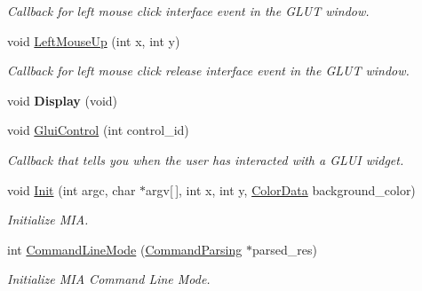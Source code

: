 \begin{DoxyCompactItemize}
\begin{DoxyCompactList}\small\item\em Callback for left mouse click interface event in the G\+L\+UT window. \end{DoxyCompactList}\item 
void \hyperlink{classimage__tools_1_1MIAApp_a2717842596d33af77f20644527a8b556}{Left\+Mouse\+Up} (int x, int y)\hypertarget{classimage__tools_1_1MIAApp_a2717842596d33af77f20644527a8b556}{}\label{classimage__tools_1_1MIAApp_a2717842596d33af77f20644527a8b556}

\begin{DoxyCompactList}\small\item\em Callback for left mouse click release interface event in the G\+L\+UT window. \end{DoxyCompactList}\item 
void {\bfseries Display} (void)\hypertarget{classimage__tools_1_1MIAApp_add76b61a146970333b216e027aabc3bc}{}\label{classimage__tools_1_1MIAApp_add76b61a146970333b216e027aabc3bc}

\item 
void \hyperlink{classimage__tools_1_1MIAApp_a4e10cc8b814e12c16c38d4e2be3bf2bb}{Glui\+Control} (int control\+\_\+id)\hypertarget{classimage__tools_1_1MIAApp_a4e10cc8b814e12c16c38d4e2be3bf2bb}{}\label{classimage__tools_1_1MIAApp_a4e10cc8b814e12c16c38d4e2be3bf2bb}

\begin{DoxyCompactList}\small\item\em Callback that tells you when the user has interacted with a G\+L\+UI widget. \end{DoxyCompactList}\item 
void \hyperlink{classimage__tools_1_1MIAApp_ab5bd2eb36e76c8bb81bef6c56f6bf55d}{Init} (int argc, char $\ast$argv\mbox{[}$\,$\mbox{]}, int x, int y, \hyperlink{classimage__tools_1_1ColorData}{Color\+Data} background\+\_\+color)
\begin{DoxyCompactList}\small\item\em Initialize M\+IA. \end{DoxyCompactList}\item 
int \hyperlink{classimage__tools_1_1MIAApp_a27afba91574efa52f0f77f62b69fc9a8}{Command\+Line\+Mode} (\hyperlink{classimage__tools_1_1CommandParsing}{Command\+Parsing} $\ast$parsed\+\_\+res)
\begin{DoxyCompactList}\small\item\em Initialize M\+IA Command Line Mode. \end{DoxyCompactList}\end{DoxyCompactItemize}
